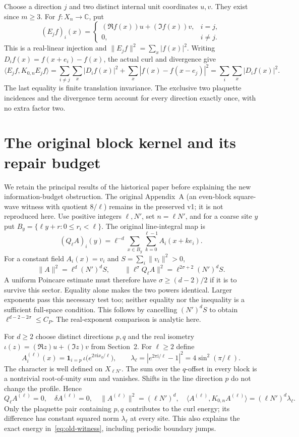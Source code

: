 \documentclass[11pt]{article}
\newcommand{\C}{\mathbb C}
\newcommand{\ip}[2]{\langle #1,#2\rangle}
\begin{document}
Choose a direction $j$ and two distinct internal unit coordinates $u,v$.
They exist since $m\geq3$. For $f:X_n\to\C$, put
\[
 (E_jf)_i(x)=\begin{cases}(\Re f(x))u+(\Im f(x))v,&i=j,\\0,&i\ne j.\end{cases}
\]
This is a real-linear injection and $\|E_jf\|^2=\sum_x|f(x)|^2$.
Writing $D_i f(x)=f(x+e_i)-f(x)$, the actual curl and divergence give
\begin{equation}\label{eq:stencil}
 \ip{E_jf}{K_{0,n}E_jf}
 =\sum_{i\ne j}\sum_x|D_i f(x)|^2+
   \sum_x|f(x)-f(x-e_j)|^2
 =\sum_i\sum_x|D_i f(x)|^2.
\end{equation}
The last equality is finite translation invariance. The exclusive two
plaquette incidences and the divergence term account for every direction
exactly once, with no extra factor two.

\section{The original block kernel and its repair budget}\label{sec:old}
We retain the principal results of the historical paper \cite{eriksson}
before explaining the new information-budget obstruction. The original
Appendix~A (an even-block square-wave witness with quotient $8/\ell$) remains
in the preserved v1; it is not reproduced here. Use positive integers
$\ell,N'$, set $n=\ell N'$, and for a coarse site $y$ put
$B_y=\{\ell y+r:0\leq r_i<\ell\}$. The original line-integral map is
\[
 (Q_\ell A)_i(y)=\ell^{-d}\sum_{x\in B_y}\sum_{k=0}^{\ell-1}A_i(x+ke_i).
\]
For a constant field $A_i(x)=v_i$ and $S=\sum_i\|v_i\|^2>0$,
\[
 \|A\|^2=\ell^d(N')^dS,\qquad
 \|\ell^\sigma Q_\ell A\|^2=\ell^{2\sigma+2}(N')^dS.
\]
A uniform Poincare estimate must therefore have
$\sigma\geq(d-2)/2$ if it is to survive this sector. Equality alone makes
the two powers identical. Larger exponents pass this necessary test too;
neither equality nor the inequality is a sufficient full-space condition.
This follows by cancelling $(N')^dS$ to obtain
$\ell^{d-2-2\sigma}\leq C_P$. The real-exponent comparison is analytic here.

For $d\geq2$ choose distinct directions $p,q$ and the real isometry
$\iota(z)=(\Re z)u+(\Im z)v$ from Section~2. For $\ell\geq2$ define
\[
 A^{(\ell)}_i(x)=\mathbf1_{i=p}\,
 \iota\bigl(e^{2\pi\mathrm i x_q/\ell}\bigr),\qquad
 \lambda_\ell=|e^{2\pi\mathrm i/\ell}-1|^2
             =4\sin^2(\pi/\ell).
\]
The character is well defined on $X_{\ell N'}$. The sum over the $q$-offset
in every block is a nontrivial root-of-unity sum and vanishes. Shifts in the
line direction $p$ do not change the profile. Hence
\begin{equation}\label{eq:old-witness}
 Q_\ell A^{(\ell)}=0,\quad \delta A^{(\ell)}=0,\quad
 \|A^{(\ell)}\|^2=(\ell N')^d,\quad
 \ip{A^{(\ell)}}{K_{0,n}A^{(\ell)}}=(\ell N')^d\lambda_\ell.
\end{equation}
Only the plaquette pair containing $p,q$ contributes to the curl energy;
its difference has constant squared norm $\lambda_\ell$ at every site.
This also explains the exact energy in~\eqref{eq:old-witness}, including
periodic boundary jumps.
\end{document}
